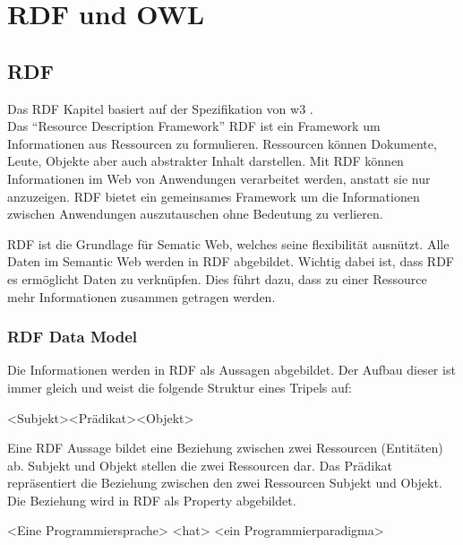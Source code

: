\chapter{RDF und OWL}
\label{chap:owl_Rdf}

\section{RDF}
\label{sec:owlRdf_rdf}

Das RDF Kapitel basiert auf der Spezifikation von w3 \cite{w3rdf}.\\
Das "`Resource Description Framework"' RDF ist ein Framework um Informationen aus Ressourcen zu formulieren. Ressourcen können Dokumente, Leute, Objekte aber auch abstrakter Inhalt darstellen. Mit RDF können Informationen im Web von Anwendungen verarbeitet werden, anstatt sie nur anzuzeigen. RDF bietet ein gemeinsames Framework um die Informationen zwischen Anwendungen auszutauschen ohne Bedeutung zu verlieren. 

RDF ist die Grundlage für Sematic Web, welches seine flexibilität ausnützt. Alle Daten im Semantic Web werden in RDF abgebildet. Wichtig dabei ist, dass RDF es ermöglicht Daten zu verknüpfen. Dies führt dazu, dass zu einer Ressource mehr Informationen zusammen getragen werden.\cite{cambSemRDF}

\subsection{RDF Data Model}
\label{subsec:owlRdf_rdf_dataModel}
Die Informationen werden in RDF als Aussagen abgebildet. Der Aufbau dieser  ist immer gleich und weist die folgende Struktur eines Tripels auf:

\noindent\hspace*{15mm}<Subjekt><Prädikat><Objekt>

Eine RDF Aussage bildet eine Beziehung zwischen zwei Ressourcen (Entitäten) ab. 
Subjekt und Objekt stellen die zwei Ressourcen dar. Das Prädikat repräsentiert die Beziehung zwischen den zwei Ressourcen Subjekt und Objekt. Die Beziehung wird in RDF als Property abgebildet. 
 
\noindent\hspace*{15mm} <Eine Programmiersprache> <hat> <ein Programmierparadigma>


